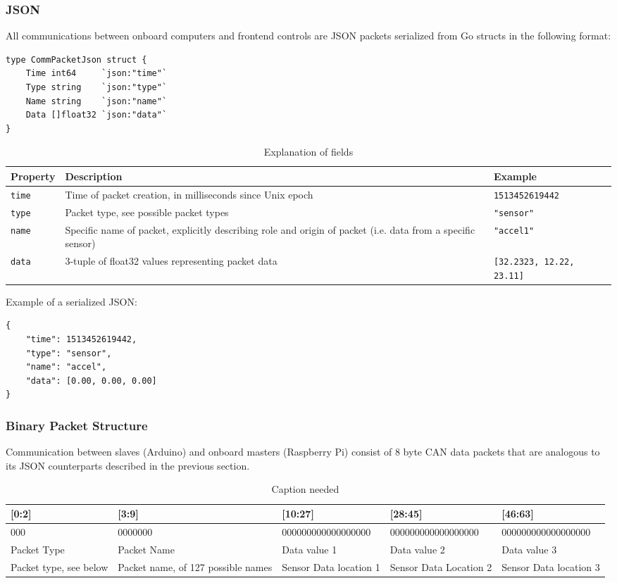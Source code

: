 \documentclass[main.tex]{subfiles}
\begin{document}
    \subsubsection{JSON}
    All communications between onboard computers and frontend controls are JSON packets serialized from Go structs in the following format:
    \begin{verbatim}
type CommPacketJson struct {
    Time int64     `json:"time"`
    Type string    `json:"type"`
    Name string    `json:"name"`
    Data []float32 `json:"data"`
}
    \end{verbatim}
    \begin{table}[H]
        \centering
        \begin{tabularx}{\textwidth}{@{}lXl@{}} \toprule
            Property & Description & Example\\ \midrule
            \verb|time| & Time of packet creation, in milliseconds since Unix epoch & \verb|1513452619442|\\
            \verb|type| & Packet type, see possible packet types & \verb|"sensor"|\\
            \verb|name| & Specific name of packet, explicitly describing role and origin of packet (i.e. data from a specific sensor) & \verb|"accel1"|\\
            \verb|data| & 3-tuple of float32 values representing packet data & \verb|[32.2323, 12.22, 23.11]|\\ \bottomrule
        \end{tabularx}
        \caption{Explanation of fields}
    \end{table}
    Example of a serialized JSON:
    \begin{verbatim}
{
    "time": 1513452619442,
    "type": "sensor",
    "name": "accel",
    "data": [0.00, 0.00, 0.00]
}
    \end{verbatim}
    \subsubsection{Binary Packet Structure}
    Communication between slaves (Arduino) and onboard masters (Raspberry Pi) consist of 8 byte CAN data packets that are analogous to its JSON counterparts described in the previous section.
    \begin{table}[H]
        \centering
        \begin{tabularx}{\textwidth}{@{}XXXXX@{}} \toprule
            {[0:2]} & {[3:9]} & {[10:27]} & {[28:45]} & {[46:63]}\\ \midrule
            000 & 0000000 & 000000000000000000 & 000000000000000000 & 000000000000000000\\
            Packet Type & Packet Name & Data value 1 & Data value 2 & Data value 3\\
            Packet type, see below & Packet name, of 127 possible names & Sensor Data location 1 & Sensor Data Location 2 & Sensor Data location 3 \\ \bottomrule
        \end{tabularx}
        \caption{Caption needed}
    \end{table}
\end{document}
